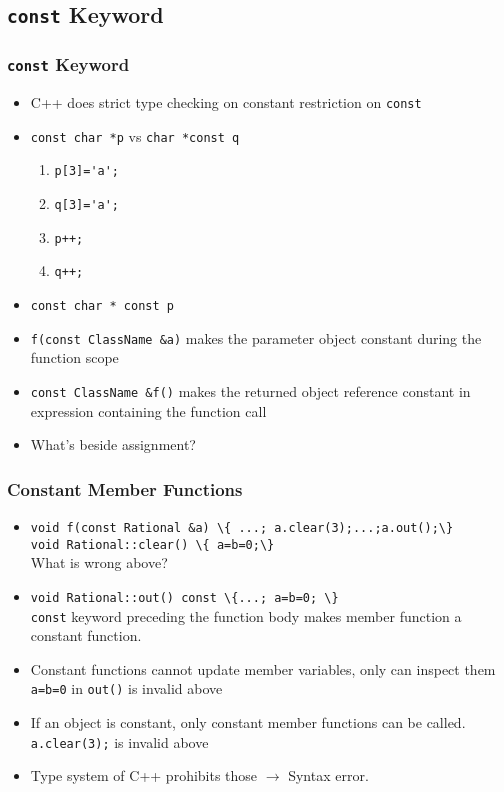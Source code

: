 \subsection{\texttt{const} Keyword}
\begin{frame}
\frametitle{\texttt{const} Keyword}
\begin{itemize}
\item C++ does strict type checking on constant restriction on \lstinline!const! 
\item \lstinline!const char *p! vs \lstinline!char *const q!\\
\begin{enumerate}
      \item \lstinline!p[3]='a';! 
      \item \lstinline!q[3]='a';! \only<2->{{\OK}}
      \item \lstinline!p++;! 
      \item \lstinline!q++;! 
\end{enumerate}
\item \lstinline!const char * const p!
\item \lstinline!f(const ClassName &a)! makes the parameter object constant during the
	function scope
\item \lstinline!const ClassName &f()! makes the returned object reference constant
	in expression containing the function call
\item What's beside assignment? 
\end{itemize}
\end{frame}

\begin{frame}
\frametitle{Constant Member Functions}
\begin{itemize}[<+->]
\item \lstinline!void f(const Rational &a) \{ ...; a.clear(3);...;a.out();\}!\\
      \lstinline!void Rational::clear() \{ a=b=0;\}!\\
	What is wrong above?
\item \lstinline!void Rational::out() const \{...; a=b=0; \}!\\
	\texttt{const} keyword preceding the function body makes member function a constant
	function.
\item Constant functions cannot update member variables, only can inspect them\\
	\alert{\texttt{a=b=0} in \texttt{out()} is invalid above}
\item If an object is constant, only constant member functions can be called.\\
	\alert{\texttt{a.clear(3);} is invalid above}
\item Type system of C++ prohibits those $\rightarrow$ Syntax error.
\end{itemize}
\end{frame}
